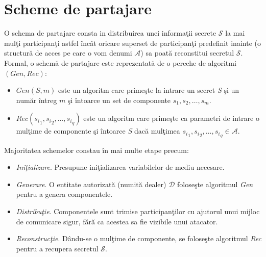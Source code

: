 \documentclass{llncs}
\begin{document}
\section{Scheme de partajare}

\label{sec:encryption}

O schema de partajare consta in distribuirea unei informa\c{t}ii secrete $\mathcal{S}$ la mai mul\c{t}i participan\c{t}i astfel \^{i}nc\^{a}t oricare superset de participan\c{t}i predefinit inainte (o structur\u{a} de acces pe care o vom denumi $\mathcal{A}$) sa poat\u{a} reconstitui secretul $\mathcal{S}$.
Formal, o schem\u{a} de partajare este reprezentat\u{a} de o pereche de algoritmi \textbf{$(Gen, Rec)$}:
\begin{itemize}
	\item \textit{$Gen(S, m)$} este un algoritm care prime\c{s}te la intrare un secret \textit{S} \c{s}i un num\u{a}r \^{i}ntreg $m$ \c{s}i \^{i}ntoarce un set de componente ${s_1, s_2, \dots, s_m}$.
	\item \textit{$Rec({s_i}_1, {s_i}_2, \dots, {s_i}_q)$} este un algoritm care prime\c{s}te ca parametri de intrare o mul\c{t}ime de componente \c{s}i \^{i}ntoarce \textit{S} dac\u{a} mul\c{t}imea ${s_i}_1, {s_i}_2, \dots, {s_i}_q \in \mathcal{A}$.
\end{itemize} 
Majoritatea schemelor constau \^{i}n mai multe etape precum:
\begin{itemize}
	\item \textit{Ini\c{t}ializare}. Presupune ini\c{t}ializarea variabilelor de mediu necesare.
	\item \textit{Generare}. O entitate autorizat\u{a} (numit\u{a} dealer) $\mathcal{D}$ folose\c{s}te algoritmul \textit{Gen} pentru a genera componentele.
	\item \textit{Distribu\c{t}ie}. Componentele sunt trimise participan\c{t}ilor cu ajutorul unui mijloc de comunicare sigur, f\u{a}r\u{a} ca acestea sa fie vizibile unui atacator.
	\item \textit{Reconstruc\c{t}ie}. D\^{a}ndu-se o mul\c{t}ime de componente, se folose\c{s}te algoritmul \textit{Rec} pentru a recupera secretul
	$\mathcal{S}$.
\end{itemize}
\end{document}
